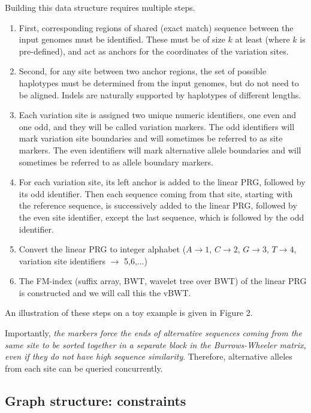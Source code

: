 \documentclass[runningheads,a4paper]{llncs}
\begin{document}
Building this data structure requires multiple steps. 
\begin{enumerate}
\item First, corresponding regions of shared (exact match) sequence between the input  genomes must be identified. These must be of size $k$ at least (where $k$ is pre-defined), and  act as anchors for the coordinates of the variation sites. 
\item Second, for any site between two anchor regions, the set of possible haplotypes must be determined from the input genomes, but  do not need to be aligned. Indels are naturally supported by haplotypes of different lengths.
\item Each variation site is assigned two unique numeric identifiers, one even and one odd, and they will be called variation markers. The odd identifiers will mark variation site boundaries and will sometimes be referred to as site markers. The even identifiers will mark alternative allele boundaries and will sometimes be referred to as allele boundary markers.
\item For each variation site, its left anchor is added to the linear PRG, followed by its odd identifier. Then each sequence coming from that site, starting with the reference sequence, is successively added to the linear PRG, followed by the even site identifier, except the last sequence, which is followed by the odd identifier.
\item Convert the linear PRG to integer alphabet ($A\rightarrow 1$, $C\rightarrow2$, $G\rightarrow3$, $T\rightarrow4$, variation site identifiers $\rightarrow$ 5,6,...)
\item The FM-index (suffix array, BWT, wavelet tree over BWT) of the linear PRG is constructed and we will call this the vBWT.
\end{enumerate}

An illustration of these steps on a toy example is given in Figure 2. 

Importantly, \textit{the markers force the ends of alternative sequences coming from the same site to be sorted together in a separate block in the Burrows-Wheeler matrix, even if they do not have high sequence similarity}. Therefore, alternative alleles from each site can be queried concurrently.


\subsection{Graph structure: constraints}
\end{document}
